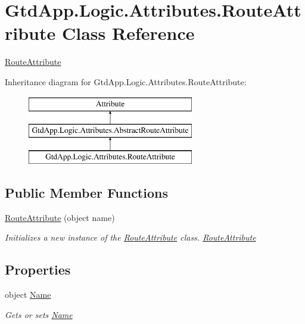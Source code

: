 \hypertarget{class_gtd_app_1_1_logic_1_1_attributes_1_1_route_attribute}{}\section{Gtd\+App.\+Logic.\+Attributes.\+Route\+Attribute Class Reference}
\label{class_gtd_app_1_1_logic_1_1_attributes_1_1_route_attribute}


\mbox{\hyperlink{class_gtd_app_1_1_logic_1_1_attributes_1_1_route_attribute}{Route\+Attribute}}  


Inheritance diagram for Gtd\+App.\+Logic.\+Attributes.\+Route\+Attribute\+:\begin{figure}[H]
\begin{center}
\leavevmode
\includegraphics[height=3.000000cm]{class_gtd_app_1_1_logic_1_1_attributes_1_1_route_attribute}
\end{center}
\end{figure}
\subsection*{Public Member Functions}
\begin{DoxyCompactItemize}
\item 
\mbox{\hyperlink{class_gtd_app_1_1_logic_1_1_attributes_1_1_route_attribute_a89b404c2fc6f273056d51fd8621ed0d3}{Route\+Attribute}} (object name)
\begin{DoxyCompactList}\small\item\em Initializes a new instance of the \mbox{\hyperlink{class_gtd_app_1_1_logic_1_1_attributes_1_1_route_attribute}{Route\+Attribute}} class. \mbox{\hyperlink{class_gtd_app_1_1_logic_1_1_attributes_1_1_route_attribute}{Route\+Attribute}} \end{DoxyCompactList}\end{DoxyCompactItemize}
\subsection*{Properties}
\begin{DoxyCompactItemize}
\item 
object \mbox{\hyperlink{class_gtd_app_1_1_logic_1_1_attributes_1_1_route_attribute_ae693a8f18d169efaccf1681eb09a9adb}{Name}}
\begin{DoxyCompactList}\small\item\em Gets or sets \mbox{\hyperlink{class_gtd_app_1_1_logic_1_1_attributes_1_1_route_attribute_ae693a8f18d169efaccf1681eb09a9adb}{Name}} \end{DoxyCompactList}\end{DoxyCompactItemize}


